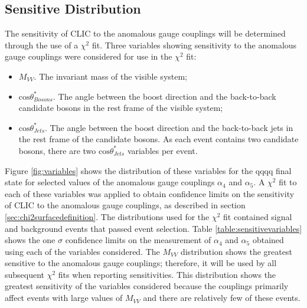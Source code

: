 \subsection{Sensitive Distribution}
The sensitivity of CLIC to the anomalous gauge couplings will be determined through the use of a $\chi^{2}$ fit.  Three variables showing sensitivity to the anomalous gauge couplings were considered for use in the $\chi^{2}$ fit:
\begin{itemize}
\item \textbf{$M_{VV}$}.  The invariant mass of the visible system;
\item \textbf{$\text{cos}\theta^{*}_{Bosons}$}.  The angle between the boost direction and the back-to-back candidate bosons in the rest frame of the visible system;
\item \textbf{$\text{cos}\theta^{*}_{Jets}$}.  The angle between the boost direction and the back-to-back jets in the rest frame of the candidate bosons.  As each event contains two candidate bosons, there are two $\text{cos}\theta^{*}_{Jets}$ variables per event. 
\end{itemize}

Figure \ref{fig:variables} shows the distribution of these variables for the  \nu{\nu}qqqq final state for selected values of the anomalous gauge couplings $\alpha_{4}$ and $\alpha_{5}$.  A $\chi^{2}$ fit to each of these variables was applied to obtain confidence limits on the sensitivity of CLIC to the anomalous gauge couplings, as described in section \ref{sec:chi2surfacedefinition}.  The distributions used for the $\chi^{2}$ fit contained signal and background events that passed event selection.  Table \ref{table:sensitivevariables} shows the one $\sigma$ confidence limits on the measurement of $\alpha_{4}$ and $\alpha_{5}$ obtained using each of the variables considered.  The $M_{VV}$ distribution shows the greatest sensitive to the anomalous gauge couplings; therefore, it will be used by all subsequent $\chi^{2}$ fits when reporting sensitivities.  This distribution shows the greatest sensitivity of the variables considered because the couplings primarily affect events with large values of $M_{VV}$ and there are relatively few of these events.    

